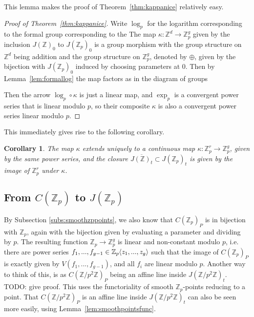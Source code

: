 \documentclass{article}
\newcommand{\Z}{\mathbb{Z}}
\renewcommand{\angle}[1]{\hspace{-2pt}\left\langle #1 \right\rangle}
\theoremstyle{plain}
\newtheorem{cor}[thm]{Corollary} %
\theoremstyle{definition}
\theoremstyle{remark}
\begin{document}
This lemma makes the proof of Theorem~\ref{thm:kappanice} relatively easy. 
\begin{proof}[Proof of Theorem~\ref{thm:kappanice}]
Write $\log_p$ for the logarithm corresponding to the formal group corresponding to the The map $\kappa: \Z^d \to \Z_p^g$ given by the inclusion $J(\Z)_0$ to $J(\Z_p)_0$ is a group morphism with the group structure on $\Z^d$ being addition and the group structure on $\Z_p^g$, denoted by $\oplus$, given by the bijection with $J(\Z_p)_0$ induced by choosing parameters at $0$. Then by Lemma~\ref{lem:formallog} the map factors as in the diagram of groups
Then the arrow $\log_p \circ \kappa$ is just a linear map, and $\exp_p$ is a convergent power series that is linear modulo $p$, so their composite $\kappa$ is also a convergent power series linear modulo $p$.
\end{proof}

This immediately gives rise to the following corollary.
\begin{cor}
\label{cor:closurejac}
The map $\kappa$ extends uniquely to a continuous map $\kappa: \Z_p^r \to \Z_p^g$, given by the same power series, and the closure $\overline{J(\Z)_t} \subset J(\Z_p)_t$ is given by the image of $\Z_p^r$ under $\kappa$.
\end{cor}

\subsection{From \texorpdfstring{$C(\Z_p)$}{C(Z\_p)} to \texorpdfstring{$J(\Z_p)$}{J(Z\_p)}}
By Subsection \ref{subs:smoothzppoints}, we also know that $C(\Z_p)_P$ is in bijection with $\Z_p$, again with the bijection given by evaluating a parameter and dividing by $p$. The resulting function $\Z_p \to \Z_p^g$ is linear and non-constant modulo $p$, i.e. there are power series $f_1,...,f_{g-1} \in \Z_p\angle{z_1,...,z_g}$ such that the image of $C(\Z_p)_P$ is exactly given by $V(f_1,...,f_{g-1})$, and all $f_i$ are linear modulo $p$. Another way to think of this, is as $C(\Z/p^2\Z)_P$ being an affine line inside $J(\Z/p^2\Z)_t$.
TODO: give proof. This uses the functoriality of smooth $\Z_p$-points reducing to a point. That $C(\Z/p^2\Z)_P$ is an affine line inside $J(\Z/p^2\Z)_t$ can also be seen more easily, using Lemma~\ref{lem:smoothpointsfunc}. 
\end{document}
